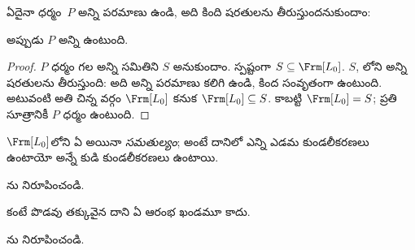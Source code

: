 \documentclass[../../../include/open-logic-section]{subfiles}
\begin{document}


\begin{thm}
  ఏదైనా ధర్మం~$P$ అన్ని పరమాణు  ఉండి, అది కింది
  షరతులను తీరుస్తుందనుకుందాం:
  \begin{enumerate}
  \end{enumerate}
  అప్పుడు $P$ అన్ని  ఉంటుంది.
\end{thm}

\begin{proof}
  $P$ ధర్మం గల అన్ని  సమితిని $S$ అనుకుందాం.
  స్పష్టంగా $S \subseteq \Frm[L_0]$. $S$,
  లోని అన్ని షరతులను తీరుస్తుంది:
  అది అన్ని పరమాణు  కలిగి ఉండి,  కింద
  సంవృతంగా ఉంటుంది. అటువంటి అతి చిన్న వర్గం $\Frm[L_0]$ కనుక
  $\Frm[L_0] \subseteq S$. కాబట్టి $\Frm[L_0] = S$; ప్రతి సూత్రానికీ
  $P$ ధర్మం ఉంటుంది.
\end{proof}

\begin{prop}
   $\Frm[L_0]$లోని ఏ  అయినా \emph{సమతుల్యం}; అంటే దానిలో
   ఎన్ని ఎడమ కుండలీకరణలు ఉంటాయో అన్నే కుడి కుండలీకరణలు ఉంటాయి.
\end{prop}

\begin{prob}
ను నిరూపించండి.
\end{prob}

\begin{prop} 
 కంటే పొడవు తక్కువైన దాని ఏ ఆరంభ ఖండమూ  కాదు.
\end{prop}

\begin{prob}
  ను నిరూపించండి.
\end{prob}
\end{document}
